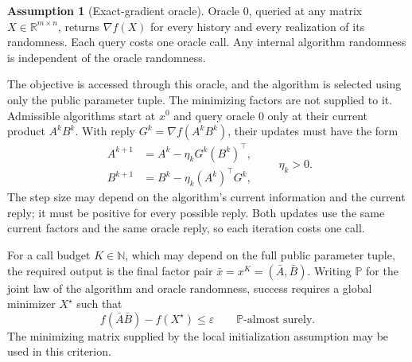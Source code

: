 \documentclass[10pt]{article}
\theoremstyle{definition}
\newtheorem{assumption}{Assumption}
\begin{document}
\begin{assumption}[Exact-gradient oracle]
Oracle $0$, queried at any matrix $X\in\mathbb{R}^{m\times n}$, returns $\nabla f(X)$ for every history and every realization of its randomness. Each query costs one oracle call. Any internal algorithm randomness is independent of the oracle randomness.
\end{assumption}

The objective is accessed through this oracle, and the algorithm is selected using only the public parameter tuple. The minimizing factors are not supplied to it. Admissible algorithms start at $x^0$ and query oracle $0$ only at their current product $A^kB^k$. With reply $G^k=\nabla f(A^kB^k)$, their updates must have the form
\[
\begin{aligned}
A^{k+1}&=A^k-\eta_k G^k(B^k)^\top,\\
B^{k+1}&=B^k-\eta_k(A^k)^\top G^k,
\end{aligned}
\qquad \eta_k>0.
\]
The step size may depend on the algorithm's current information and the current reply; it must be positive for every possible reply. Both updates use the same current factors and the same oracle reply, so each iteration costs one call.

For a call budget $K\in\mathbb{N}$, which may depend on the full public parameter tuple, the required output is the final factor pair $\bar{x}=x^K=(\bar{A},\bar{B})$. Writing $\mathbb{P}$ for the joint law of the algorithm and oracle randomness, success requires a global minimizer $X^\star$ such that
\[
f(\bar{A}\bar{B})-f(X^\star)\leq\varepsilon
\qquad\mathbb{P}\text{-almost surely}.
\]
The minimizing matrix supplied by the local initialization assumption may be used in this criterion.
\end{document}
